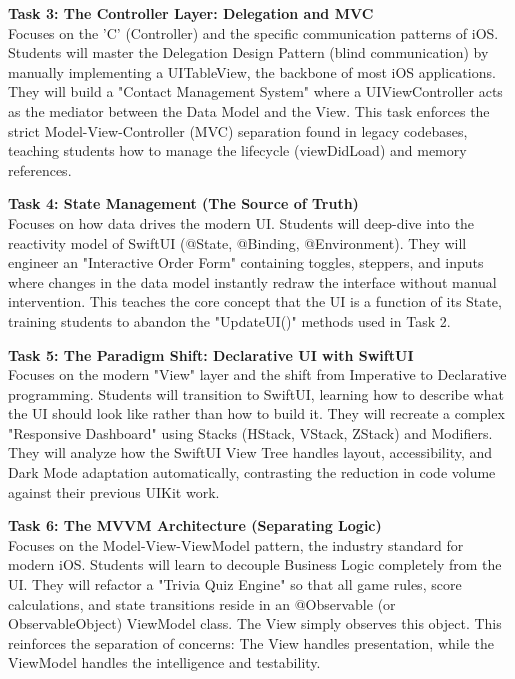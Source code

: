 \vspace{0.3cm}

\noindent\textbf{Task 3: The Controller Layer: Delegation and MVC} \\
Focuses on the 'C' (Controller) and the specific communication patterns of iOS. Students will master the Delegation Design Pattern (blind communication) by manually implementing a UITableView, the backbone of most iOS applications. They will build a "Contact Management System" where a UIViewController acts as the mediator between the Data Model and the View. This task enforces the strict Model-View-Controller (MVC) separation found in legacy codebases, teaching students how to manage the lifecycle (viewDidLoad) and memory references.

\vspace{0.3cm}

\noindent\textbf{Task 4: State Management (The Source of Truth)} \\
Focuses on how data drives the modern UI. Students will deep-dive into the reactivity model of SwiftUI (@State, @Binding, @Environment). They will engineer an "Interactive Order Form" containing toggles, steppers, and inputs where changes in the data model instantly redraw the interface without manual intervention. This teaches the core concept that the UI is a function of its State, training students to abandon the "UpdateUI()" methods used in Task 2.

\vspace{0.3cm}

\noindent\textbf{Task 5: The Paradigm Shift: Declarative UI with SwiftUI} \\
Focuses on the modern "View" layer and the shift from Imperative to Declarative programming. Students will transition to SwiftUI, learning how to describe what the UI should look like rather than how to build it. They will recreate a complex "Responsive Dashboard" using Stacks (HStack, VStack, ZStack) and Modifiers. They will analyze how the SwiftUI View Tree handles layout, accessibility, and Dark Mode adaptation automatically, contrasting the reduction in code volume against their previous UIKit work.

\vspace{0.3cm}

\noindent\textbf{Task 6: The MVVM Architecture (Separating Logic)} \\
Focuses on the Model-View-ViewModel pattern, the industry standard for modern iOS. Students will learn to decouple Business Logic completely from the UI. They will refactor a "Trivia Quiz Engine" so that all game rules, score calculations, and state transitions reside in an @Observable (or ObservableObject) ViewModel class. The View simply observes this object. This reinforces the separation of concerns: The View handles presentation, while the ViewModel handles the intelligence and testability.

